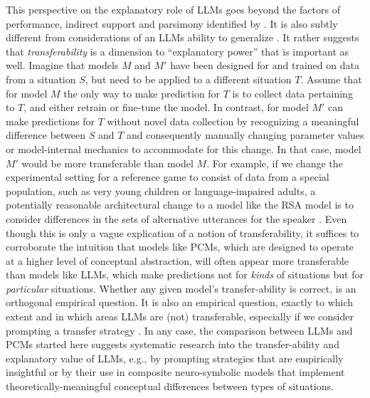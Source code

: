\documentclass[fleqn]{article}
\begin{document}
This perspective on the explanatory role of LLMs goes beyond the factors of performance, indirect support and parsimony identified by \citet{SortNoopDeemtervan-Deemter2023:Dimensions-of-E}.
It is also subtly different from considerations of an LLMs ability to generalize \citep{HupkesDankers2020:Compositionalit}.
It rather suggests that \emph{transferability} is a dimension to ``explanatory power'' that is important as well.
Imagine that models $M$ and $M'$ have been designed for and trained on data from a situation $S$, but need to be applied to a different situation $T$.
Assume that for model $M$ the only way to make prediction for $T$ is to collect data pertaining to $T$, and either retrain or fine-tune the model.
In contrast, for model $M'$ can make predictions for $T$ without novel data collection by recognizing a meaningful difference between $S$ and $T$ and consequently manually changing parameter values or model-internal mechanics to accommodate for this change.
In that case, model $M'$ would be more transferable than model $M$.
For example, if we change the experimental setting for a reference game to consist of data from a special population, such as very young children or language-impaired adults, a potentially reasonable architectural change to a model like the RSA model is to consider differences in the sets of alternative utterances for the speaker \citep[e.g.][]{Noveck2001:When-Children-a}.
Even though this is only a vague explication of a notion of transferability, it suffices to corroborate the intuition that models like PCMs, which are designed to operate at a higher level of conceptual abstraction, will often appear more transferable than models like LLMs, which make predictions not for \emph{kinds} of situations but for \emph{particular} situations.
Whether any given model's transfer-ability is correct, is an orthogonal empirical question.
It is also an empirical question, exactly to which extent and in which areas LLMs are (not) transferable, especially if we consider prompting a transfer strategy \citep{LiuLiu2022:Generated-Knowl,XieRaghunathan2022:An-Explanation-}.
In any case, the comparison between LLMs and PCMs started here suggests systematic research into the transfer-ability and explanatory value of LLMs, e.g., by prompting strategies that are empirically insightful or by their use in composite neuro-symbolic models that implement theoretically-meaningful conceptual differences between types of situations.
\end{document}
